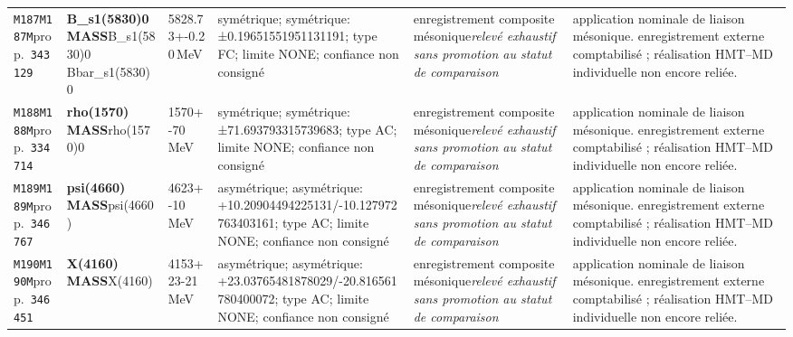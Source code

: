 \begin{landscape}
\begin{longtable}{L{1.85cm}L{4.45cm}L{2.35cm}L{4.05cm}L{3.35cm}L{7.15cm}}
\texttt{M187}\newline \texttt{M187M}\newline prop.\ \texttt{343129} & \textbf{B\_\allowbreak{}s1(5830)0 MASS}\newline B\_\allowbreak{}s1(5830)0 \textbar{}\allowbreak{} Bbar\_\allowbreak{}s1(5830)0 & 5828.73+-0.20\,MeV & symétrique; symétrique: ±0.19651551951131191; type FC; limite NONE; confiance non consigné & enregistrement composite mésonique\newline \emph{relevé exhaustif sans promotion au statut de comparaison} & application nominale de liaison mésonique. enregistrement externe comptabilisé ; réalisation HMT--MD individuelle non encore reliée. \\
\texttt{M188}\newline \texttt{M188M}\newline prop.\ \texttt{334714} & \textbf{rho(1570) MASS}\newline rho(1570)0 & 1570+-70\,MeV & symétrique; symétrique: ±71.693793315739683; type AC; limite NONE; confiance non consigné & enregistrement composite mésonique\newline \emph{relevé exhaustif sans promotion au statut de comparaison} & application nominale de liaison mésonique. enregistrement externe comptabilisé ; réalisation HMT--MD individuelle non encore reliée. \\
\texttt{M189}\newline \texttt{M189M}\newline prop.\ \texttt{346767} & \textbf{psi(4660) MASS}\newline psi(4660) & 4623+-10\,MeV & asymétrique; asymétrique: +10.20904494225131/-10.127972763403161; type AC; limite NONE; confiance non consigné & enregistrement composite mésonique\newline \emph{relevé exhaustif sans promotion au statut de comparaison} & application nominale de liaison mésonique. enregistrement externe comptabilisé ; réalisation HMT--MD individuelle non encore reliée. \\
\texttt{M190}\newline \texttt{M190M}\newline prop.\ \texttt{346451} & \textbf{X(4160) MASS}\newline X(4160) & 4153+23-21\,MeV & asymétrique; asymétrique: +23.03765481878029/-20.816561780400072; type AC; limite NONE; confiance non consigné & enregistrement composite mésonique\newline \emph{relevé exhaustif sans promotion au statut de comparaison} & application nominale de liaison mésonique. enregistrement externe comptabilisé ; réalisation HMT--MD individuelle non encore reliée. \\

\end{longtable}
\end{landscape}
